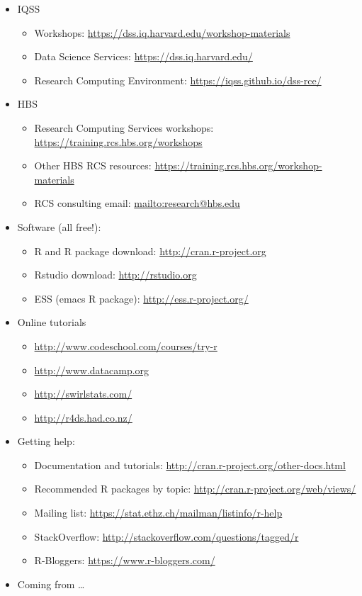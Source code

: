 \documentclass[]{book}
\providecommand{\tightlist}{%
  \setlength{\itemsep}{0pt}\setlength{\parskip}{0pt}}
\begin{document}
\begin{itemize}
\tightlist
\item
  IQSS

  \begin{itemize}
  \tightlist
  \item
    Workshops: \url{https://dss.iq.harvard.edu/workshop-materials}
  \item
    Data Science Services: \url{https://dss.iq.harvard.edu/}
  \item
    Research Computing Environment:
    \url{https://iqss.github.io/dss-rce/}
  \end{itemize}
\item
  HBS

  \begin{itemize}
  \tightlist
  \item
    Research Computing Services workshops:
    \url{https://training.rcs.hbs.org/workshops}
  \item
    Other HBS RCS resources:
    \url{https://training.rcs.hbs.org/workshop-materials}
  \item
    RCS consulting email: \url{mailto:research@hbs.edu}
  \end{itemize}
\item
  Software (all free!):

  \begin{itemize}
  \tightlist
  \item
    R and R package download: \url{http://cran.r-project.org}
  \item
    Rstudio download: \url{http://rstudio.org}
  \item
    ESS (emacs R package): \url{http://ess.r-project.org/}
  \end{itemize}
\item
  Online tutorials

  \begin{itemize}
  \tightlist
  \item
    \url{http://www.codeschool.com/courses/try-r}
  \item
    \url{http://www.datacamp.org}
  \item
    \url{http://swirlstats.com/}
  \item
    \url{http://r4ds.had.co.nz/}
  \end{itemize}
\item
  Getting help:

  \begin{itemize}
  \tightlist
  \item
    Documentation and tutorials:
    \url{http://cran.r-project.org/other-docs.html}
  \item
    Recommended R packages by topic:
    \url{http://cran.r-project.org/web/views/}
  \item
    Mailing list: \url{https://stat.ethz.ch/mailman/listinfo/r-help}
  \item
    StackOverflow: \url{http://stackoverflow.com/questions/tagged/r}
  \item
    R-Bloggers: \url{https://www.r-bloggers.com/}
  \end{itemize}
\item
  Coming from \ldots{}


\end{itemize}
\end{document}
